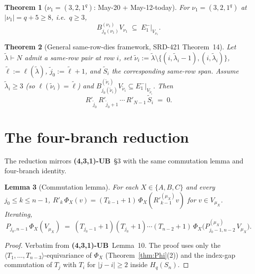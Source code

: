 \documentclass[11pt]{article}
\newtheorem{theorem}{Theorem}
\newtheorem{lemma}[theorem]{Lemma}
\theoremstyle{definition}
\begin{document}
\begin{theorem}[$\nu_1 = (3, 2, 1^q)$: May-20 + May-12-today]\label{thm:nu1}
For $\nu_1 = (3, 2, 1^q)$ at $|\nu_1| = q + 5 \ge 8$, i.e.\ $q \ge 3$,
\[
   B^{(\nu_1)}_{j_0(\nu_1)} V_{\nu_1} \;\subseteq\; E_1^-|_{V_{\nu_1}}.
\]
\end{theorem}

\begin{theorem}[General same-row-dies framework, SRD-421 Theorem~14]\label{thm:srd-framework}
Let $\widetilde\lambda \vdash N$ admit a same-row pair at row $i$, set
$\widetilde\nu_i := \widetilde\lambda \setminus \{(i, \widetilde\lambda_i - 1),
(i, \widetilde\lambda_i)\}$, $\widetilde\ell := \ell(\widetilde\lambda)$,
$\widetilde j_0 := \widetilde\ell + 1$, and $\widetilde S_i$ the
corresponding same-row span. Assume $\widetilde\lambda_i \ge 3$
(so $\ell(\widetilde\nu_i) = \widetilde\ell$) and
$B^{(\widetilde\nu_i)}_{j_0(\widetilde\nu_i)} V_{\widetilde\nu_i}
\subseteq E_1^-|_{V_{\widetilde\nu_i}}$. Then
\[
   R'_{\widetilde j_0}\, R'_{\widetilde j_0 + 1}\, \cdots\, R'_{N-1}
   \, \widetilde S_i \;=\; 0.
\]
\end{theorem}

\section{The four-branch reduction}\label{sec:reduction}

The reduction mirrors \textbf{(4,3,1)-UB}~\S3 with the same commutation
lemma and four-branch identity.

\begin{lemma}[Commutation lemma]\label{lem:commute}
For each $X \in \{A, B, C\}$ and every $j_0 \le k \le n - 1$,
$R'_k\, \Phi_X(v) = (T_{k-1}{+}1) \, \Phi_X(R'^{(\mu_X)}_{k-1} v)$ for
$v \in V_{\mu_X}$. Iterating,
\begin{equation}\label{eq:commute-P}
   P_{j_0, n-1}\, \Phi_X(V_{\mu_X})
   \;=\; (T_{j_0-1}{+}1)(T_{j_0}{+}1)\cdots(T_{n-2}{+}1)
       \, \Phi_X\!\big(P^{(\mu_X)}_{j_0-1, n-2}\, V_{\mu_X}\big).
\end{equation}
\end{lemma}

\begin{proof}
Verbatim from \textbf{(4,3,1)-UB}~Lemma~10. The proof uses only the
$\langle T_1, \ldots, T_{n-3}\rangle$-equivariance of $\Phi_X$
(Theorem~\ref{thm:Phi}(2)) and the index-gap commutation of $T_j$
with $T_i$ for $|j - i| \ge 2$ inside $H_q(S_n)$.
\end{proof}
\end{document}
